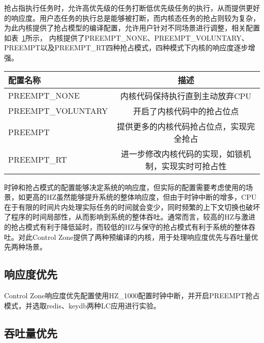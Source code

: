 抢占指执行任务时，允许高优先级的任务打断低优先级任务的执行，从而提供更好的响应度。用户态任务的执行总是能够被打断，而内核态任务的抢占则较为复杂，为此内核提供了抢占模型的编译配置，允许用户针对不同场景进行调整，相关配置如表~\ref{tab:config_preempt}所示， 内核提供了PREEMPT\_NONE、PREEMPT\_VOLUNTARY、PREEMPT以及PREEMPT\_RT四种抢占模式，四种模式下内核的响应度逐步增强。

\begin{table}
    \label{tab:config_preempt}
    \footnotesize%
    \setlength{\tabcolsep}{4pt}%
    \renewcommand{\arraystretch}{1.5}%
    \centering
    \begin{tabular}{lc}
        \hline
        配置名称 & 描述 \\
        \hline
        PREEMPT\_NONE  & 内核代码保持执行直到主动放弃CPU  \\
        PREEMPT\_VOLUNTARY  & 开启了内核代码中的抢占位点 \\
        PREEMPT  & 提供更多的内核代码抢占位点，实现完全抢占 \\
        PREEMPT\_RT & 进一步修改内核代码的实现，如锁机制，实现实时可抢占性 \\
        \hline
    \end{tabular}
\end{table}

时钟和抢占模式的配置能够决定系统的响应度，但实际的配置需要考虑使用的场景，如更高的HZ虽然能够提升系统的整体响应度，但由于时钟中断的增多，CPU在于有限的时间片内处理实际任务的时间就会变少，同时频繁的上下文切换也破坏了程序的时间局部性，从而影响到系统的整体吞吐。通常而言，较高的HZ与激进的抢占模式有利于降低延时，而较低的HZ与保守的抢占模式有利于系统的整体吞吐。对此Control Zone提供了两种预编译的内核，用于处理响应度优先与吞吐量优先两种场景。


\subsection{响应度优先}


Control Zone响应度优先配置使用HZ\_1000配置时钟中断，并开启PREEMPT抢占模式，并选取redis、keydb两种LC应用进行实验。


\subsection{吞吐量优先}

